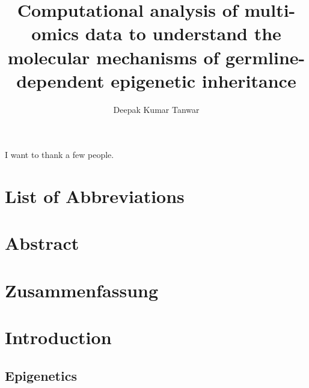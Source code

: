 \documentclass[12pt,twoside]{reedthesis}
\title{Computational analysis of multi-omics data to understand the molecular mechanisms of germline-dependent epigenetic inheritance}
\author{Deepak Kumar Tanwar}
\date{}
\begin{document}
  \maketitle

\frontmatter %
\pagestyle{empty} %
  \begin{acknowledgements}
    I want to thank a few people.
  \end{acknowledgements}

  \hypersetup{linkcolor=black}
  \setcounter{secnumdepth}{2}
  \setcounter{tocdepth}{2}
  \tableofcontents

  \listoftables

  \listoffigures



\mainmatter %
\pagestyle{fancyplain} %

\hypertarget{list-of-abbreviations}{%
\chapter*{List of Abbreviations}\label{list-of-abbreviations}}
\begin{acronym}[MPC]
\end{acronym}
\hypertarget{abstract}{%
\chapter*{Abstract}\label{abstract}}

\hypertarget{abstract-de}{%
\chapter*{Zusammenfassung}\label{abstract-de}}

\hypertarget{intro}{%
\chapter*{Introduction}\label{intro}}

\hypertarget{epigenetics}{%
\section{Epigenetics}\label{epigenetics}}
\end{document}

